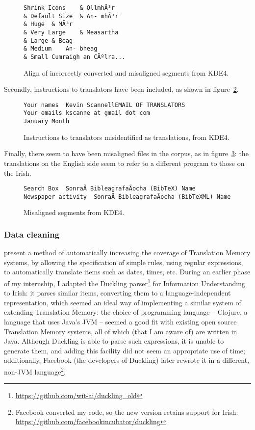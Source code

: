 \begin{figure}
\begin{verbatim}
Shrink Icons	& OllmhÃ³r
& Default Size	& An- mhÃ³r
& Huge	& MÃ³r
& Very Large	& Measartha
& Large	& Beag
& Medium	An- bheag
& Small	Cumraigh an CÃºlra...
\end{verbatim}
\label{fig:kdeenc}
\caption{Align of incorrectly converted and misaligned segments from KDE4.}
\end{figure}


Secondly, instructions to translators have been included, as shown in figure~\ref{fig:kdetrans}.

\begin{figure}
\begin{verbatim}
Your names	Kevin ScannellEMAIL OF TRANSLATORS
Your emails	kscanne at gmail dot com
January	Month
\end{verbatim}
\label{fig:kdetrans}
\caption{Instructions to translators misidentified as translations, from KDE4.}
\end{figure}

Finally, there seem to have been misaligned files in the corpus, as in figure~\ref{fig:kdemisalign}:
the translations on the English side seem to refer to a different program to those on the Irish.

\begin{figure}
\begin{verbatim}
Search Box	SonraÃ­ BibleagrafaÃ­ocha (BibTeX) Name
Newspaper activity	SonraÃ­ BibleagrafaÃ­ocha (BibTeXML) Name
\end{verbatim}
\label{fig:kdemisalign}
\caption{Misaligned segments from KDE4.}
\end{figure}

\subsubsection{Data cleaning}

\citet{GJ2008} present a method of automatically increasing the coverage of Translation Memory systems,
by allowing the specification of simple rules, using regular expressions, to automatically translate
items such as dates, times, etc. During an earlier phase of my internship, I adapted the Duckling
parser\footnote{\href{https://github.com/wit-ai/duckling\_old}{https://github.com/wit-ai/duckling\_old}} 
for Information Understanding to Irish: it parses similar items, converting them to a 
language-independent representation, which seemed an ideal way of implementing a similar system of
extending Translation Memory: the choice of programming language -- Clojure, a language that uses Java's JVM -- seemed a good fit with
existing open source Translation Memory systems, all of which (that I am aware of) are written in Java.
Although Duckling is able to parse such expressions, it is unable to generate them, and adding this
facility did not seem an appropriate use of time; additionally, Facebook (the developers of Duckling)
later rewrote it in a different, non-JVM language\footnote{Facebook converted my code, so the new version
retains support for Irish: \href{https://github.com/facebookincubator/duckling}{https://github.com/facebookincubator/duckling}}.

